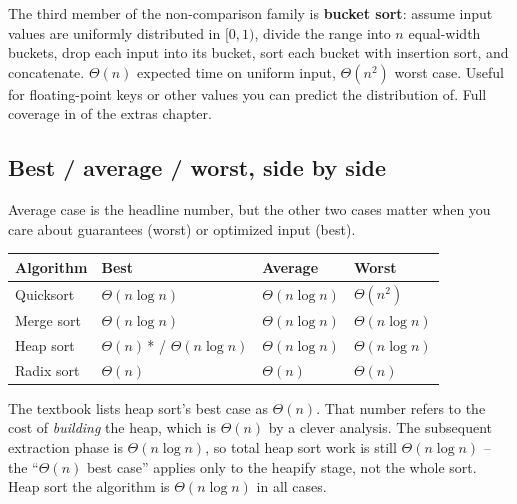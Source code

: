 \documentclass[11pt]{article}
\begin{document}
\begin{notebox}
The third member of the non-comparison family is \textbf{bucket
sort}: assume input values are uniformly distributed in $[0, 1)$,
divide the range into $n$ equal-width buckets, drop each input
into its bucket, sort each bucket with insertion sort, and
concatenate. $\Theta(n)$ expected time on uniform input,
$\Theta(n^2)$ worst case. Useful for floating-point keys or other
values you can predict the distribution of. Full coverage in
 of the extras chapter.
\end{notebox}

\subsection{Best / average / worst, side by side}

Average case is the headline number, but the other two cases matter
when you care about guarantees (worst) or optimized input (best).

\begin{center}
\footnotesize
\renewcommand{\arraystretch}{1.3}
\begin{tabular}{@{}llll@{}}
\hline
\textbf{Algorithm} & \textbf{Best} & \textbf{Average} & \textbf{Worst} \\
\hline
Quicksort   & $\Theta(n \log n)$  & $\Theta(n \log n)$ & $\Theta(n^2)$ \\
Merge sort  & $\Theta(n \log n)$  & $\Theta(n \log n)$ & $\Theta(n \log n)$ \\
Heap sort   & $\Theta(n)$\,* / $\Theta(n \log n)$ & $\Theta(n \log n)$ & $\Theta(n \log n)$ \\
Radix sort  & $\Theta(n)$         & $\Theta(n)$         & $\Theta(n)$ \\
\hline
\end{tabular}
\end{center}

\begin{notebox}
The textbook lists heap sort's best case as $\Theta(n)$. That number
refers to the cost of \emph{building} the heap, which is $\Theta(n)$
by a clever analysis. The subsequent extraction phase is
$\Theta(n \log n)$, so total heap sort work is still
$\Theta(n \log n)$ -- the ``$\Theta(n)$ best case'' applies only to
the heapify stage, not the whole sort. Heap sort the algorithm is
$\Theta(n \log n)$ in all cases.
\end{notebox}
\end{document}
